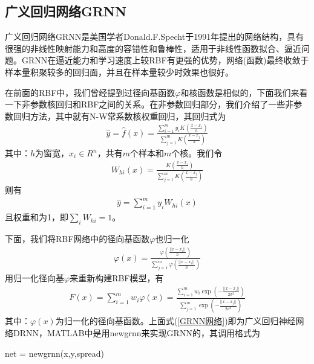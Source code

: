     \subsection{广义回归网络GRNN}
        \par
        广义回归网络GRNN是美国学者Donald.F.Specht于1991年提出的网络结构，具有很强的非线性映射能力和高度的容错性和鲁棒性，适用于非线性函数拟合、逼近问题。GRNN在逼近能力和学习速度上较RBF有更强的优势，网络(函数)最终收敛于样本量积聚较多的回归面，并且在样本量较少时效果也很好。
        \par
        在前面的RBF中，我们曾经提到过径向基函数$\varphi$和核函数是相似的，下面我们来看一下非参数核回归和RBF之间的关系。在非参数回归部分，我们介绍了一些非参数回归方法，其中就有N-W常系数核权重回归，其回归式为
        \begin{align*}
        \hat{y} = \hat{f}(x) = \frac{\sum\limits_{i=1}^m y_i K \left( \frac{x-x_i}{h} \right)  }{\sum\limits_{j=1}^m  K \left( \frac{x-x_j}{h} \right) }
        \end{align*}
        其中：$h$为窗宽，$x_i\in R^n$，共有$m$个样本和$m$个核。我们令
        \begin{align*}
        W_{hi}(x) = \frac{K \left( \frac{x-x_i}{h} \right)}{\sum\limits_{j=1}^m K \left( \frac{x-x_j}{h} \right)}
        \end{align*}
        则有
        \begin{align}
        \label{NW非参数回归}
        \hat{y} = \sum_{i=1}^m y_i W_{hi}(x)
        \end{align}
        且权重和为1，即$\sum_i W_{hi} = 1$。
        \par
        下面，我们将RBF网络中的径向基函数$\varphi$也归一化
        \begin{align*}
        \varphi(x) = \frac{\varphi \left( \frac{||x-x_i||}{h} \right)   }{\sum\limits_{j=1}^m \varphi \left( \frac{||x-x_i||}{h} \right)}
        \end{align*}
        用归一化径向基$\varphi$来重新构建RBF模型，有
        \begin{align}
        \label{GRNN网络}
        F(x) = \sum_{i=1}^m w_i \varphi(x) = \frac{\sum\limits_{i=1}^m w_i \exp \left( -\frac{||x-x_i||}{2\sigma^2} \right)  }{\sum\limits_{j=1}^m \exp \left( -\frac{||x-x_j||}{2\sigma^2} \right) }
        \end{align}
        其中：$\varphi(x)$为归一化的径向基函数。上面式(\ref{GRNN网络})即为广义回归神经网络DRNN，MATLAB中是用newgrnn来实现GRNN的，其调用格式为
        \par
        net = newgrnn(x,y,spread)

